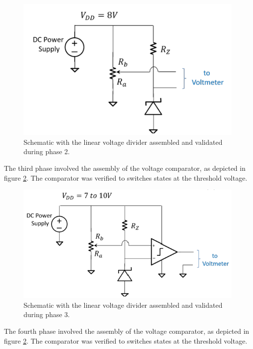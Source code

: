 \documentclass[conference]{IEEEtran}
\begin{document}
\begin{figure}[htbp]
\centerline{\includegraphics{./images/circuit2.png}}
\caption{Schematic with the linear voltage divider assembled and validated during phase 2. \cite{week7}}
\label{circuit2}
\end{figure}

The third phase involved the assembly of the voltage comparator, as depicted in figure \ref{circuit3}. The comparator was verified to switches states at the threshold voltage.

\begin{figure}[htbp]
\centerline{\includegraphics{./images/circuit3.png}}
\caption{Schematic with the linear voltage divider assembled and validated during phase 3. \cite{week7}}
\label{circuit3}
\end{figure}

The fourth phase involved the assembly of the voltage comparator, as depicted in figure \ref{circuit3}. The comparator was verified to switches states at the threshold voltage.
\end{document}
